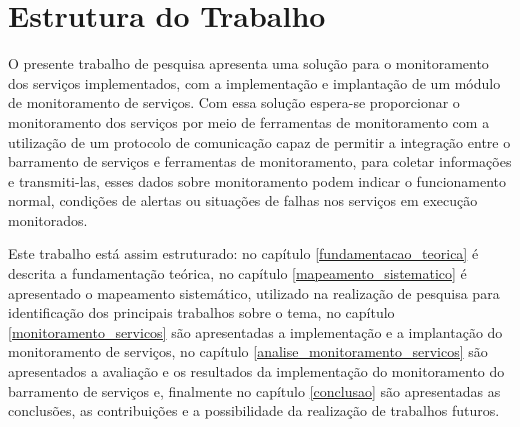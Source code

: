 
\section{Estrutura do Trabalho}

O presente trabalho de pesquisa apresenta uma solução para o monitoramento dos serviços implementados, com a implementação e implantação de um módulo de monitoramento de serviços. Com essa solução espera-se proporcionar o monitoramento dos serviços por meio de ferramentas de monitoramento com a utilização de um protocolo de comunicação capaz de permitir a integração entre o barramento de serviços e ferramentas de monitoramento, para coletar informações e transmiti-las, esses dados sobre monitoramento podem indicar o funcionamento normal, condições de alertas ou situações de falhas nos serviços em execução monitorados.

Este trabalho está assim estruturado: no capítulo \ref{fundamentacao_teorica} é descrita a fundamentação teórica, no capítulo \ref{mapeamento_sistematico} é apresentado o mapeamento sistemático, utilizado na realização de pesquisa para identificação dos principais trabalhos sobre o tema, no capítulo \ref{monitoramento_servicos} são apresentadas a implementação e a implantação do monitoramento de serviços, no capítulo \ref{analise_monitoramento_servicos} são apresentados a avaliação e os resultados da implementação do monitoramento do barramento de serviços e, finalmente no capítulo \ref{conclusao} são apresentadas as conclusões, as contribuições e a possibilidade da realização de trabalhos futuros.